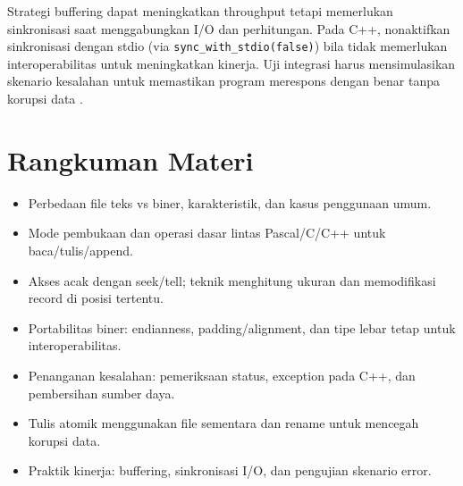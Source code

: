 \documentclass[../main.tex]{subfiles}
\begin{document}
Strategi buffering dapat meningkatkan throughput tetapi memerlukan sinkronisasi saat menggabungkan I/O dan perhitungan. Pada C++, nonaktifkan sinkronisasi dengan stdio (via \texttt{sync\_with\_stdio(false)}) bila tidak memerlukan interoperabilitas untuk meningkatkan kinerja. Uji integrasi harus mensimulasikan skenario kesalahan untuk memastikan program merespons dengan benar tanpa korupsi data \parencite{cplusplus-io,cpp-reference}.

\section{Rangkuman Materi}
\begin{itemize}
  \item Perbedaan file teks vs biner, karakteristik, dan kasus penggunaan umum.
  \item Mode pembukaan dan operasi dasar lintas Pascal/C/C++ untuk baca/tulis/append.
  \item Akses acak dengan seek/tell; teknik menghitung ukuran dan memodifikasi record di posisi tertentu.
  \item Portabilitas biner: endianness, padding/alignment, dan tipe lebar tetap untuk interoperabilitas.
  \item Penanganan kesalahan: pemeriksaan status, exception pada C++, dan pembersihan sumber daya.
  \item Tulis atomik menggunakan file sementara dan rename untuk mencegah korupsi data.
  \item Praktik kinerja: buffering, sinkronisasi I/O, dan pengujian skenario error.
\end{itemize}
\end{document}
